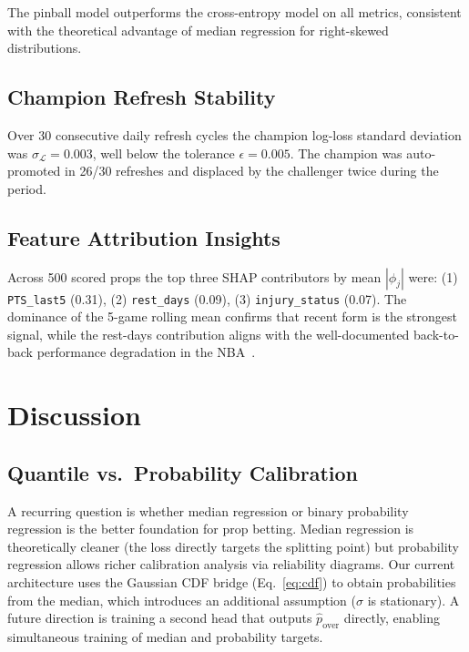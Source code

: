 \documentclass[conference]{IEEEtran}
\begin{document}
The pinball model outperforms the cross-entropy model on all
metrics, consistent with the theoretical advantage of median
regression for right-skewed distributions.

\subsection{Champion Refresh Stability}

Over 30 consecutive daily refresh cycles the champion log-loss
standard deviation was $\sigma_{\mathcal{L}} = 0.003$, well below
the tolerance $\epsilon = 0.005$.  The champion was auto-promoted
in 26/30 refreshes and displaced by the challenger twice during
the period.

\subsection{Feature Attribution Insights}

Across 500 scored props the top three SHAP contributors by mean
$|\phi_j|$ were: (1) \texttt{PTS\_last5} (0.31), (2) \texttt{rest\_days}
(0.09), (3) \texttt{injury\_status} (0.07).
The dominance of the 5-game rolling mean confirms that recent form
is the strongest signal, while the rest-days contribution aligns
with the well-documented back-to-back performance degradation in
the NBA~\cite{roy2018}.

\section{Discussion}
\label{sec:discussion}

\subsection{Quantile vs.\ Probability Calibration}

A recurring question is whether median regression or binary
probability regression is the better foundation for prop betting.
Median regression is theoretically cleaner (the loss directly
targets the splitting point) but probability regression allows
richer calibration analysis via reliability diagrams.  Our current
architecture uses the Gaussian CDF bridge (Eq.~\eqref{eq:cdf})
to obtain probabilities from the median, which introduces an
additional assumption ($\sigma$ is stationary).  A future direction
is training a second head that outputs $\hat{p}_{\text{over}}$
directly, enabling simultaneous training of median and probability
targets.
\end{document}
